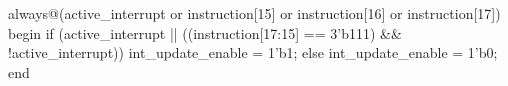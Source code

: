 \begin{vcode}
always@(active_interrupt or instruction[15] or instruction[16] or instruction[17])
begin
    if (active_interrupt || ((instruction[17:15] == 3'b111) && !active_interrupt))
        int_update_enable = 1'b1;
    else
        int_update_enable = 1'b0;
end
\end{vcode}


